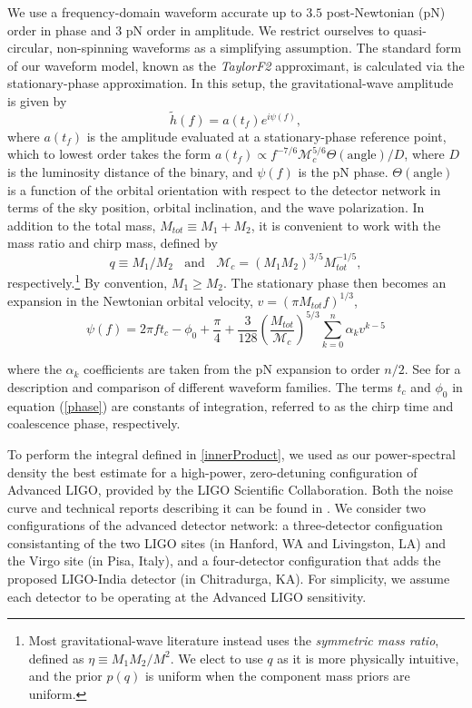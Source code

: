 \documentclass[11pt,a4paper]{emulateapj} 
\newcommand{\chmass}{\mathcal{M}_c}
\begin{document}
We use a frequency-domain waveform accurate up to $3.5$ post-Newtonian
(pN) order in phase and 3 pN order in amplitude.  We restrict
ourselves to quasi-circular, non-spinning waveforms as a simplifying
assumption.  The standard form of our waveform model, known as the
\textit{TaylorF2} approximant, is calculated via the stationary-phase
approximation.  In this setup, the gravitational-wave amplitude is
given by
\begin{equation}
\tilde{h}(f) = a(t_f) e^{i \psi(f)},
\label{amplitude}
\end{equation}
where $a(t_f)$ is the amplitude evaluated at a stationary-phase
reference point, which to lowest order takes the form $a(t_f) \propto
f^{-7/6} \chmass^{5/6}\Theta(\text{angle})/D$, where $D$ is the
luminosity distance of the binary, and $\psi(f)$ is the pN phase.
$\Theta(\text{angle})$ is a function of the orbital orientation with
respect to the detector network in terms of the sky position, orbital
inclination, and the wave polarization.  In addition to the total
mass, $M_{tot}\equiv M_1+M_2$, it is convenient to work with the mass
ratio and chirp mass, defined by
\begin{equation}
  q\equiv M_1/M_2~~~~\text{and}~~~~\chmass = (M_1 M_2)^{3/5}
  M_{tot}^{-1/5},
  \label{eqRatioCM}
\end{equation}
respectively.\footnote{Most gravitational-wave literature instead uses
  the \textit{symmetric mass ratio}, defined as $\eta \equiv M_1 M_2 /
  M^2$.  We elect to use $q$ as it is more physically intuitive, and
  the prior $p(q)$ is uniform when the component mass priors are
  uniform.}  By convention, $M_1 \geq M_2$.  The stationary phase then
becomes an expansion in the Newtonian orbital velocity, $v=(\pi
M_{tot} f)^{1/3}$,
\begin{equation}
\psi(f) = 2 \pi f t_c - \phi_0 + \frac{\pi}{4} +
\frac{3}{128}\left(\frac{M_{tot}}{\chmass}\right)^{5/3}\sum^{n}_{k=0}\alpha_{k}v^{k-5}
\label{phase}
\end{equation}

\noindent where the $\alpha_{k}$ coefficients are taken from the pN
expansion to order $n/2$.  See \cite{BuonannoWaveform} for a
description and comparison of different waveform families.  The terms
$t_c$ and $\phi_0$ in equation (\ref{phase}) are constants of
integration, referred to as the chirp time and coalescence phase,
respectively.

To perform the integral defined in \eqref{innerProduct}, we used as
our power-spectral density the best estimate for a high-power,
zero-detuning configuration of Advanced LIGO, provided by the LIGO
Scientific Collaboration.  Both the noise curve and technical reports
describing it can be found in \cite{ADVLIGONoise}.  We consider two
configurations of the advanced detector network: a three-detector
configuation consistanting of the two LIGO sites (in Hanford, WA and
Livingston, LA) and the Virgo site (in Pisa, Italy), and a
four-detector configuration that adds the proposed LIGO-India detector
(in Chitradurga, KA).  For simplicity, we assume each detector to be
operating at the Advanced LIGO sensitivity.
\end{document}
